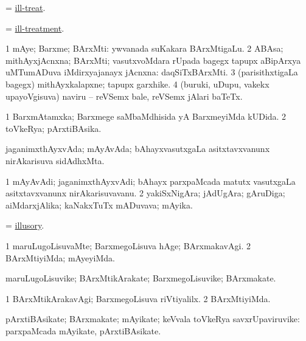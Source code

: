 \bentry
{}
\gl{\sakirx}
\bmng
 = \hyperlink{ill-treat}{ill-treat}. 
\emng
\eentry

\bentry
{}
\gl{\nA}
\bmng
 = \hyperlink{ill-treatment}{ill-treatment}. 
\emng
\eentry

\bentry
{}
\gl{\nA}
\bmng
\bnum
\num{1} mAye; Barxme; BArxMti:  ywvanada suKakara BArxMtigaLu. 
\num{2} ABAsa; mithAyxjAcnxna; BArxMti; vasutxvoMdara rUpada bagegx tapupx aBipArxya uMTumADuva iMdirxyajanayx jAcnxna:  daqSiTxBArxMti. 
\num{3} (parisithxtigaLa bagegx) mithAyxkalapxne; tapupx garxhike. 
\num{4} (buruki, uDupu, \mo vakekx upayoVgisuva) naviru -- reVSemx bale, reVSemx jAlari baTeTx. 
\enum
\emng
\eentry

\bentry
{}
\gl{\gu}
\bmng
\bnum
\num{1} BarxmAtamxka; Barxmege saMbaMdhisida yA BarxmeyiMda kUDida. 
\num{2} toVkeRya; pArxtiBAsika. 
\enum
\emng
\eentry

\bentry
{}
\gl{\nA}
\bmng
jaganimxthAyxvAda; mAyAvAda; bAhayxvasutxgaLa asitxtavxvanunx nirAkarisuva sidAdhxMta. 
\emng
\eentry

\bentry
{}
\gl{\nA}
\bmng
\bnum
\num{1} mAyAvAdi; jaganimxthAyxvAdi; bAhayx parxpaMcada matutx vasutxgaLa asitxtavxvanunx nirAkarisuvavanu. 
\num{2} yakiSxNigAra; jAdUgAra; gAruDiga; aiMdarxjAlika; kaNakxTuTx mADuvava; mAyika. 
\enum
\emng
\eentry

\bentry
{}
\gl{\gu}
\bmng
 = \hyperlink{illusory}{illusory}. 
\emng
\eentry

\bentry
{}
\gl{\kirxvi}
\bmng
\bnum
\num{1} maruLugoLisuvaMte; BarxmegoLisuva hAge; BArxmakavAgi. 
\num{2} BArxMtiyiMda; mAyeyiMda. 
\enum
\emng
\eentry

\bentry
{}
\gl{\nA}
\bmng
maruLugoLisuvike; BArxMtikArakate; BarxmegoLisuvike; BArxmakate. 
\emng
\eentry

\bentry
{}
\gl{\kirxvi}
\bmng
\bnum
\num{1} BArxMtikArakavAgi; BarxmegoLisuva riVtiyalilx. 
\num{2} BArxMtiyiMda. 
\enum
\emng
\eentry

\bentry
{}
\gl{\nA}
\bmng
pArxtiBAsikate; BArxmakate; mAyikate; keVvala toVkeRya savxrUpaviruvike:  parxpaMcada mAyikate, pArxtiBAsikate. 
\emng
\eentry


